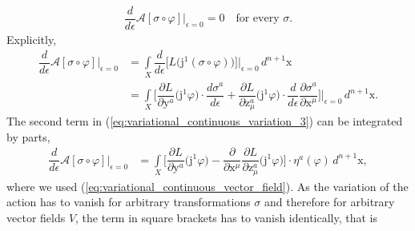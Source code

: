 \documentclass[12pt,a4paper,reqno]{article}
\begin{document}
\begin{align}\label{eq:variational_continuous_variation_1}
\dfrac{d}{d{\ensuremath{\epsilon}}} \mathcal{A} [ \sigma \circ {\ensuremath{\varphi}} ] \bigg\vert_{{\ensuremath{\epsilon}}=0} = 0
\quad
\text{for every $\sigma$} .
\end{align}
Explicitly,
\begin{align}
\dfrac{d}{d{\ensuremath{\epsilon}}} \mathcal{A} [ \sigma \circ {\ensuremath{\varphi}} ] \bigg\vert_{{\ensuremath{\epsilon}}=0}
\label{eq:variational_continuous_variation_2}
&= \int \limits_{X} \dfrac{d}{d{\ensuremath{\epsilon}}} \Big[ L \big( {\ensuremath{\mathrm{j}}}^{1} ( \sigma \circ {\ensuremath{\varphi}}) \big) \Big] \bigg\vert_{{\ensuremath{\epsilon}}=0} \, d^{n+1} {\ensuremath{{\ensuremath{\mathrm{{x}}}}}} \\
\label{eq:variational_continuous_variation_3}
&= \int \limits_{X} \bigg[ \dfrac{\partial L}{\partial {\ensuremath{{\ensuremath{\mathrm{{y}}}}}}^{a}} \big( {\ensuremath{\mathrm{j}}}^{1} {\ensuremath{\varphi}} \big) \cdot \dfrac{d \sigma^{a}}{d {\ensuremath{\epsilon}}} + \dfrac{\partial L}{\partial {\ensuremath{{\ensuremath{\mathrm{{z}}}}}}^{a}_{\mu}} \big( {\ensuremath{\mathrm{j}}}^{1} {\ensuremath{\varphi}} \big) \cdot \dfrac{d}{d {\ensuremath{\epsilon}}} \dfrac{\partial \sigma^{a}}{\partial {\ensuremath{{\ensuremath{\mathrm{{x}}}}}}^{\mu}} \bigg] \bigg\vert_{{\ensuremath{\epsilon}}=0} \, d^{n+1} {\ensuremath{{\ensuremath{\mathrm{{x}}}}}} .
\end{align}
The second term in (\ref{eq:variational_continuous_variation_3}) can be integrated by parts,
\begin{align}\label{eq:variational_continuous_variation_4}
\dfrac{d}{d{\ensuremath{\epsilon}}} \mathcal{A} [ \sigma \circ {\ensuremath{\varphi}} ] \bigg\vert_{{\ensuremath{\epsilon}}=0}
&= \int \limits_{X} \bigg[ \dfrac{\partial L}{\partial {\ensuremath{{\ensuremath{\mathrm{{y}}}}}}^{a}} \big( {\ensuremath{\mathrm{j}}}^{1} {\ensuremath{\varphi}} \big) - \dfrac{\partial}{\partial {\ensuremath{{\ensuremath{\mathrm{{x}}}}}}^{\mu}} \dfrac{\partial L}{\partial {\ensuremath{{\ensuremath{\mathrm{{z}}}}}}^{a}_{\mu}} \big( {\ensuremath{\mathrm{j}}}^{1} {\ensuremath{\varphi}} \big) \bigg] \cdot \eta^{a} ({\ensuremath{\varphi}}) \, d^{n+1} {\ensuremath{{\ensuremath{\mathrm{{x}}}}}} ,
\end{align}
where we used (\ref{eq:variational_continuous_vector_field}).
As the variation of the action has to vanish for arbitrary transformations $\sigma$ and therefore for arbitrary vector fields $V$, the term in square brackets has to vanish identically, that is
\end{document}
